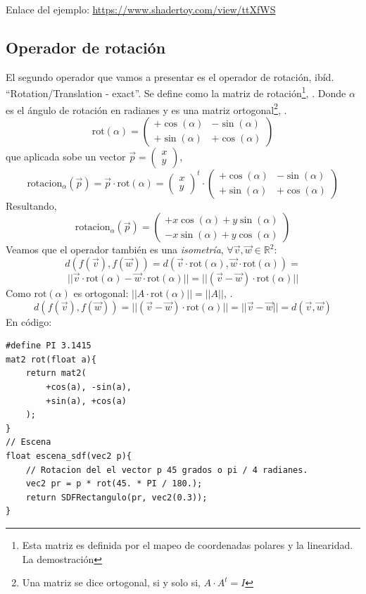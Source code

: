 Enlace del ejemplo:
\url{https://www.shadertoy.com/view/ttXfWS}

\subsection{Operador de rotación}
El segundo operador que vamos a presentar es el operador de rotación, ibíd. \enquote{Rotation/Translation - exact}. Se define como la matriz de rotación\footnote{Esta matriz es definida por el mapeo de coordenadas polares y la linearidad. La demostración}, \cite{53181}. Donde \(\alpha\) es el ángulo de rotación en radianes y es una matriz ortogonal\footnote{Una matriz se dice ortogonal, si y solo si, \(A\cdot A^t=I\)}, \cite{2471175}.
\[ 
\text{rot}(\alpha)=\begin{pmatrix}
    +\cos(\alpha) & -\sin(\alpha)\\
    +\sin(\alpha) & +\cos(\alpha)
\end{pmatrix}
\]
que aplicada sobe un vector \(\Vec{p}=\begin{pmatrix}
    x\\
    y
\end{pmatrix}\),
\[ 
\text{rotacion}_\alpha(\Vec{p})=\Vec{p}\cdot\text{rot}(\alpha)=\begin{pmatrix}
    x\\
    y
\end{pmatrix}^t\cdot\begin{pmatrix}
    +\cos(\alpha) & -\sin(\alpha)\\
    +\sin(\alpha) & +\cos(\alpha)
\end{pmatrix}
\]
Resultando,
\[\text{rotacion}_\alpha(\Vec{p})=\begin{pmatrix}
    +x\cos(\alpha) + y\sin(\alpha)\\
    -x\sin(\alpha) + y\cos(\alpha)
\end{pmatrix}
\]
Veamos que el operador también es una \textit{isometría}, \(\forall \Vec{v},\Vec{w}\in\mathbb{R}^2\):
\[d(f(\Vec{v}), f(\Vec{w}))=d(\Vec{v}\cdot \text{rot}(\alpha), \Vec{w}\cdot \text{rot}(\alpha))=\]\[\vert\vert \Vec{v}\cdot \text{rot}(\alpha)- \Vec{w}\cdot \text{rot}(\alpha)\vert\vert=\vert\vert(\Vec{v}-\Vec{w})\cdot \text{rot}(\alpha)\vert\vert\]
Como \(\text{rot}(\alpha)\) es ortogonal: \(\vert\vert A\cdot\text{rot}(\alpha)\vert\vert=\vert\vert A\vert\vert\), \cite{2245861}.
\[d(f(\Vec{v}), f(\Vec{w}))=\vert\vert(\Vec{v}-\Vec{w})\cdot \text{rot}(\alpha)\vert\vert=\vert\vert\Vec{v}-\Vec{w}\vert\vert=d(\Vec{v},\Vec{w})\]
En código:
\begin{lstlisting}
#define PI 3.1415
mat2 rot(float a){
    return mat2(
        +cos(a), -sin(a), 
        +sin(a), +cos(a)
    );
}
// Escena
float escena_sdf(vec2 p){
    // Rotacion del el vector p 45 grados o pi / 4 radianes.
    vec2 pr = p * rot(45. * PI / 180.);
    return SDFRectangulo(pr, vec2(0.3));
}
\end{lstlisting}

